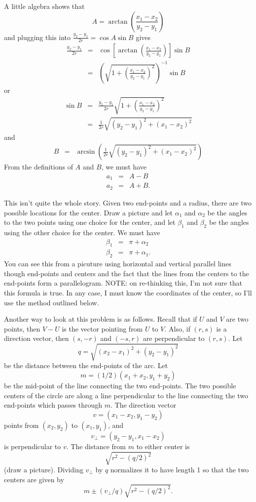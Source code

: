 \documentclass[titlepage,oneside,10pt]{article}
\begin{document}
A little algebra shows that
$$A = \arctan\left(\frac{x_1-x_2}{y_2-y_1}\right)$$
and plugging this into $\frac{y_2-y_1}{2r} = \cos A \sin B$ gives
\begin{eqnarray*}
\frac{y_2-y_1}{2r} &=&
\cos\left[\arctan\left(\frac{x_1-x_2}{y_2-y_1}\right)\right] \sin B\\
&=&
\left(\sqrt{1+\left(\frac{x_1-x_2}{y_2-y_1}\right)^2}\right)^{-1}\sin B
\end{eqnarray*}
or
\begin{eqnarray*}
\sin B &=& \frac{y_2-y_1}{2r}
\sqrt{1+\left(\frac{x_1-x_2}{y_2-y_1}\right)^2}\\
&=& \frac{1}{2r}\sqrt{(y_2-y_1)^2+(x_1-x_2)^2}
\end{eqnarray*}
and
\begin{eqnarray*}
B &=&
\arcsin\left(\frac{1}{2r}\sqrt{(y_2-y_1)^2+(x_1-x_2)^2}\right)
\end{eqnarray*}
From the definitions of $A$ and $B$, we must have
\begin{eqnarray*}
a_1 &=& A-B\\
a_2 &=& A+B.
\end{eqnarray*}

This isn't quite the whole story. Given two end-points and a
radius, there are two possible locations for the center. Draw a
picture and let $\alpha_1$ and $\alpha_2$ be the angles to the two
points using one choice for the center, and let $\beta_1$ and $\beta_2$ be
the angles using the other choice for the center. We must have
\begin{eqnarray*}
\beta_1 &=& \pi + \alpha_2\\
\beta_2 &=& \pi + \alpha_1.
\end{eqnarray*}
You can see this from a picuture using horizontal and vertical
parallel lines though end-points and centers and the fact that the
lines from the centers to the end-points form a parallelogram. NOTE: on
re-thinking this, I'm not sure that this formula is true. In any case,
I must know the coordinates of the center, so I'll use the method
outlined below.

Another way to look at this problem is as follows. Recall that if $U$
and $V$ are two points, then $V-U$ is the vector pointing from $U$ to
$V$. Also, if $(r,s)$ is a direction vector, then $(s,-r)$ and
$(-s,r)$ are perpendicular to $(r,s)$. Let 
$$q = \sqrt{(x_2-x_1)^2+(y_2-y_1)^2}$$
be the distance between the end-points of the arc. Let
$$m = (1/2)(x_1+x_2,y_1+y_2)$$
be the mid-point of the line connecting the two end-points. The two
possible centers of the circle are along a line perpendicular to the
line connecting the two end-points which passes through $m$. The
direction vector
$$v = (x_1-x_2,y_1-y_2)$$
points from $(x_2,y_2)$ to $(x_1,y_1)$, and
$$v_{\perp} = (y_2-y_1,x_1-x_2)$$
is perpendicular to $v$. The distance from $m$ to either center is
$$\sqrt{r^2-(q/2)^2}$$
(draw a picture). Dividing $v_\perp$ by $q$ normalizes it to have
length 1 so that the two centers are given by
$$m\pm (v_\perp/q)\sqrt{r^2-(q/2)^2}.$$
\end{document}
